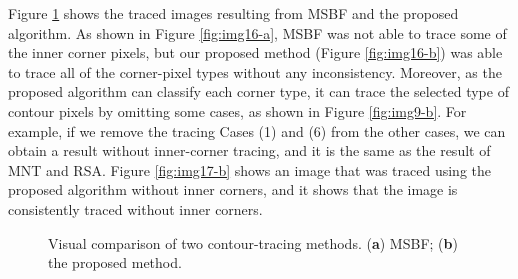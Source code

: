 \documentclass[sensors,article,accept,moreauthors,pdftex,10pt,a4paper]{mdpi}
\begin{document}
\begin{table}[H]
{\begin{tabular}{cccccccccccccc}
\bottomrule

\end{tabular}
}
\end{table}


Figure \ref{fig:image16} shows the traced images resulting from MSBF and the proposed algorithm. As shown in Figure \ref{fig:img16-a}, MSBF was not able to trace some of the inner corner pixels, but our proposed method (Figure \ref{fig:img16-b}) was able to trace all of the corner-pixel types without any inconsistency. Moreover, as the proposed algorithm can classify each corner type, it can trace the selected type of contour pixels by omitting some cases, as shown in Figure \ref{fig:img9-b}. For example, if we remove the tracing Cases (1) and (6) from the other cases, we can obtain a result without inner-corner tracing, and it is the same as the result of MNT and RSA. Figure \ref{fig:img17-b} shows an image that was traced using the proposed algorithm without inner corners, and it shows that the image is consistently traced without inner corners.


\begin{figure}[H]
	\centering

	\caption{Visual comparison of two contour-tracing methods. (\textbf{a}) MSBF; (\textbf{b}) the proposed method.}
	\label{fig:image16}
\end{figure}

\end{document}

